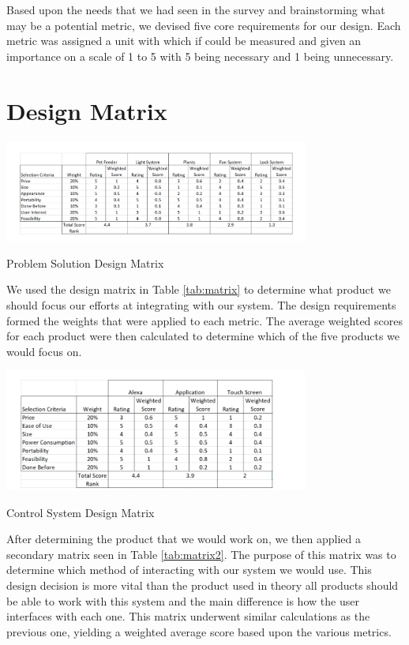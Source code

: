 \documentclass[notitlepage,11pt]{article}
\begin{document}
        Based upon the needs that we had seen in the survey and brainstorming what may be a potential metric, we devised 
        five core requirements for our design. Each metric was assigned a unit with which if could be measured and given
        an importance on a scale of 1 to 5 with 5 being necessary and 1 being unnecessary.

    \section{Design Matrix}

        \begin{table}[!htb]
            \label{tab:matrix}
            \centering
            \includegraphics[width=0.75\textwidth]{images/matrix1.png}
            \caption{Problem Solution Design Matrix}
        \end{table}        
        
        We used the design matrix in Table \ref{tab:matrix} to determine what product we should focus our efforts at 
        integrating with our system. The design requirements formed the weights that were applied to each metric. The 
        average weighted scores for each product were then calculated to determine which of the five products we would 
        focus on.

        \begin{table}[!htb]
            \label{tab:matrix2}
            \centering
            \includegraphics[width=0.75\textwidth]{images/matrix2.png}
            \caption{Control System Design Matrix}
        \end{table}

        After determining the product that we would work on, we then applied a secondary matrix seen in Table \ref{tab:matrix2}.
        The purpose of this matrix was to determine which method of interacting with our system we would use. This 
        design decision is more vital than the product used in theory all products should be able to work with this 
        system and the main difference is how the user interfaces with each one. This matrix underwent similar 
        calculations as the previous one, yielding a weighted average score based upon the various metrics.
\end{document}
